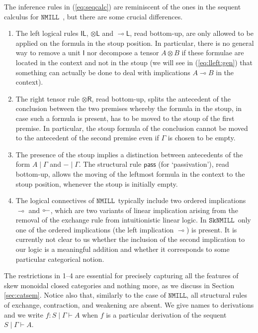 \documentclass[copyright,creativecommons]{eptcs}
\theoremstyle{definition}
\newcommand{\tl}{\otimes \mathsf{L}}
\newcommand{\tr}{\otimes \mathsf{R}}
\newcommand{\lleft}{{\multimap}\mathsf{L}}
\newcommand{\pass}{\mathsf{pass}}
\newcommand{\unitl}{\mathsf{IL}}
\newcommand{\ot}{\otimes}
\newcommand{\lolli}{\multimap}
\newcommand{\illol}{\rotatebox[origin=c]{180}{$\multimap$}}
\newcommand{\I}{\mathsf{I}}
\newcommand{\NMILL}{$\mathtt{NMILL}$}
\newcommand{\SkNMILL}{$\mathtt{SkNMILL}$}
\newcommand{\niccolo}[1]{{\color{red}\textbf{Niccol{\`o}: }#1}}
\begin{document}

The inference rules in (\ref{eq:seqcalc}) are reminiscent of the ones in the sequent calculus for \NMILL\ \cite{abrusci:noncommutative:1990}, but there are some crucial differences.
\begin{enumerate}
\item The left logical rules $\unitl$, $\tl$ and $\lleft$, read bottom-up, are only allowed to be applied on the formula in the stoup position. In particular, there is no general way to remove a unit $\I$ nor decompose a tensor $A \ot B$ if these formulae are located in the context and not in the stoup (we will see in (\ref{eq:lleft:gen}) that something can actually be done to deal with implications $A \lolli B$ in the context).
\item The right tensor rule $\tr$, read bottom-up, splits the antecedent of the conclusion between the two premises whereby the formula in the stoup, in case such a formula is present, has to be moved to the stoup of the first premise. In particular, the stoup formula of the conclusion cannot be moved to the antecedent of the second premise even if $\Gamma$ is chosen to be empty.
\item The presence of the stoup implies a distinction between antecedents of the form $A \mid \Gamma$ and ${-} \mid \Gamma$. The structural rule $\pass$ (for `passivation'), read bottom-up, allows the moving of the leftmost formula in the context to the stoup position, whenever the stoup is initially empty.
\item The logical connectives of \NMILL\ typically include two ordered implications $\lolli$ and $\illol$, which are two variants of linear implication arising from the removal of the exchange rule from intuitionistic linear logic. In \SkNMILL\ only one of the ordered implications (the left implication $\lolli$) is present. It is currently not clear to us whether the inclusion of the second implication to our logic is a meaningful addition and whether it corresponds to some particular categorical notion.
\end{enumerate}
The restrictions in 1--4 are essential for precisely capturing all the features of skew monoidal closed categories and nothing more, as we discuss in Section \ref{sec:catsem}.
Notice also that, similarly to the case of \NMILL, all structural rules of exchange, contraction, and weakening are absent. We give names to derivations and we write $f : S \mid \Gamma \vdash A$ when $f$ is a particular derivation of the sequent $S \mid \Gamma \vdash A$.
\end{document}

